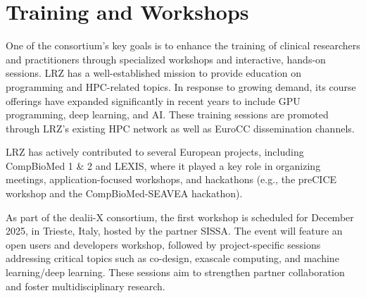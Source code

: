 \documentclass[a4paper,12pt]{article}
\begin{document}
\section{Training and Workshops}

One of the consortium’s key goals is to enhance the training of clinical
researchers and practitioners through specialized workshops and interactive,
hands-on sessions. LRZ has a well-established mission to provide education on
programming and HPC-related topics. In response to growing demand, its course
offerings have expanded significantly in recent years to include GPU
programming, deep learning, and AI. These training sessions are promoted
through LRZ’s existing HPC network as well as EuroCC dissemination channels.

LRZ has actively contributed to several European projects, including
CompBioMed 1 \& 2 and LEXIS, where it played a key role in organizing meetings,
application-focused workshops, and hackathons (e.g., the preCICE workshop and
the CompBioMed-SEAVEA hackathon).

As part of the dealii-X consortium, the first workshop is scheduled for
December 2025, in Trieste, Italy, hosted by the partner SISSA. The event will
feature an open users and developers workshop, followed by project-specific
sessions addressing critical topics such as co-design, exascale computing, and
machine learning/deep learning. These sessions aim to strengthen partner
collaboration and foster multidisciplinary research.

\label{MyLastPage}
\end{document}
